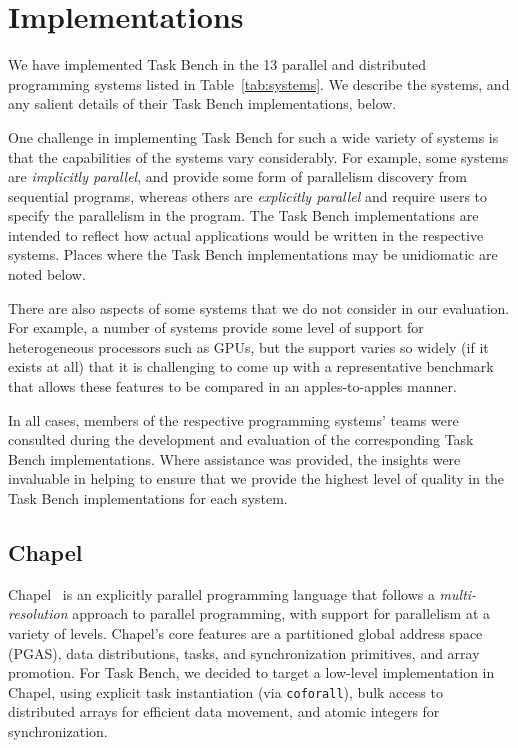 \section{Implementations}
\label{sec:implementation}



We have implemented Task Bench in the 13 parallel and distributed
programming systems listed in Table~\ref{tab:systems}. We describe the
systems, and any salient details of their Task Bench implementations,
below.

One challenge in implementing Task Bench for such a wide variety of
systems is that the capabilities of the systems vary considerably. For
example, some systems are \emph{implicitly parallel}, and provide some
form of parallelism discovery from sequential programs, whereas others
are \emph{explicitly parallel} and require users to specify the
parallelism in the program. The Task
Bench implementations are intended to reflect how actual applications
would be written in the respective systems. Places where the Task
Bench implementations may be unidiomatic are noted below.

There are also aspects of some systems that we do not consider in our
evaluation. For example, a number of systems provide some level of
support for heterogeneous processors such as GPUs, but the support
varies so widely (if it exists at all) that it is challenging to come
up with a representative benchmark that allows these features to be
compared in an apples-to-apples manner.

In all cases, members of the respective programming systems' teams
were consulted during the development and evaluation of the
corresponding Task Bench implementations. Where assistance was provided, the insights were invaluable
in helping to ensure that we provide the highest level of quality in the Task
Bench implementations for each system.

\subsection{Chapel}

Chapel~\cite{Chapel15} is an explicitly parallel programming language
that follows a \emph{multi-resolution} approach to parallel
programming, with support for parallelism at a variety of
levels. Chapel's core features are a partitioned global address space
(PGAS), data distributions, tasks, and
synchronization primitives, and array promotion. For Task Bench, we decided to target a low-level implementation in
Chapel, using explicit task instantiation (via
\lstinline[language=Chapel]{coforall}), bulk access to distributed
arrays for efficient data movement, and atomic integers for
synchronization.

